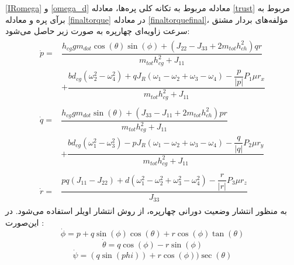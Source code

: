 \ref{IRomega} و
 \ref{omega_d}
 معادله مربوط به تکانه کلی پره‌ها، 
 معادله \ref{trust}
مربوط به برآی پره و معادله 
\ref{finaltorque}
در معادله 
\ref{finaltorquefinal}،
مؤلفه‌های بردار مشتق سرعت زاویه‌ای چهارپره به صورت زیر حاصل می‌شود:
\begin{align}
	\begin{split}
		\dot{p} =& \dfrac{h_{cg}gm_{dot}\cos(\theta)\sin(\phi)
			+\left(J_{22} - J_{33} +2m_{tot}h_{ch}^2\right)qr
		}
		{m_{tot}h_{cg}^2 + J_{11}} \\
		&+\dfrac{bd_{cg}\left(\omega_2^2-\omega_4^2\right) + qJ_R(\omega_1-\omega_2+\omega_3-\omega_4) - \dfrac{p}{\lvert p \rvert}P_1\mu r_x}
		{m_{tot}h_{cg}^2 + J_{11}}
	\end{split}\\[1em]
		\begin{split}
		\dot{q} =& \dfrac{h_{cg}gm_{dot}\sin(\theta)
			+\left(J_{33} - J_{11} +2m_{tot}h_{ch}^2\right)pr
		}
		{m_{tot}h_{cg}^2 + J_{11}} \\
		&+\dfrac{bd_{cg}\left(\omega_1^2-\omega_3^2\right) - pJ_R(\omega_1-\omega_2+\omega_3-\omega_4)- \dfrac{q}{\lvert q \rvert}P_2\mu r_y}
		{m_{tot}h_{cg}^2 + J_{11}}
	\end{split}\\[1em]
	\begin{split}
		\dot{r} =& \dfrac{pq(J_{11}-J_{22})
		+ d(\omega_1^2-\omega_2^2+\omega_3^2-\omega_4^2) - \dfrac{r}{\lvert r \rvert}P_3\mu r_z
	}{J_{33}}
	\end{split}
\end{align}
به منظور انتشار وضعیت دورانی چهارپره، از روش انتشار اویلر استفاده می‌شود. در این‌صورت
\cite{zipfel2000modeling}
:
$$\dot\phi = p + q\sin(\phi)\cos(\theta) +‌
r\cos(\phi)\tan(\theta)
$$
$$
\dot \theta = q\cos(\phi) - r\sin(\phi)
$$
$$
\dot\psi = (q\sin(phi)) + r\cos(\phi))\sec(\theta) 
$$

